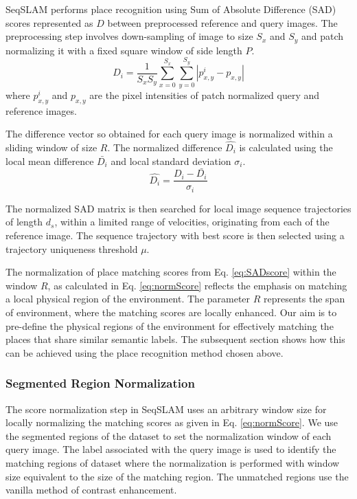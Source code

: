 \documentclass[letterpaper, 10 pt, conference]{ieeeconf}  %
\begin{document}
SeqSLAM performs place recognition using Sum of Absolute Difference (SAD) scores represented as $D$ between preprocessed reference and query images. The preprocessing step involves down-sampling of image to size $S_x$ and $S_y$ and patch normalizing it with a fixed square window of side length $P$.
\begin{equation}
 D_i = \frac{1}{S_xS_y} \sum\limits_{x=0}^{S_x}\sum\limits_{y=0}^{S_y}|p_{x,y}^i-p_{x,y}|
 \label{eq:SADscore}
\end{equation}
where $p_{x,y}^i$ and $p_{x,y}$ are the pixel intensities of patch normalized query and reference images.

The difference vector so obtained for each query image is normalized within a sliding window of size $R$. The normalized difference $\hat{D_i}$ is calculated using the local mean difference $\bar{D_i}$ and local standard deviation $\sigma_i$.
\begin{equation}
 \hat{D_i} = \frac{D_i-\bar{D_i}}{\sigma_i}
 \label{eq:normScore}
\end{equation}

The normalized SAD matrix is then searched for local image sequence trajectories of length $d_s$, within a limited range of velocities, originating from each of the reference image. The sequence trajectory with best score is then selected using a trajectory uniqueness threshold $\mu$.

The normalization of place matching scores from Eq. \ref{eq:SADscore} within the window $R$, as calculated in Eq. \ref{eq:normScore} reflects the emphasis on matching a local physical region of the environment. The parameter $R$ represents the span of environment, where the matching scores are locally enhanced. Our aim is to pre-define the physical regions of the environment for effectively matching the places that share similar semantic labels. The subsequent section shows how this can be achieved using the place recognition method chosen above.

\subsubsection{Segmented Region Normalization}
The score normalization step in SeqSLAM uses an arbitrary window size for locally normalizing the matching scores as given in Eq. \ref{eq:normScore}. We use the segmented regions of the dataset to set the normalization window of each query image. The label associated with the query image is used to identify the matching regions of dataset where the normalization is performed with window size equivalent to the size of the matching region. The unmatched regions use the vanilla method of contrast enhancement.
\end{document}
